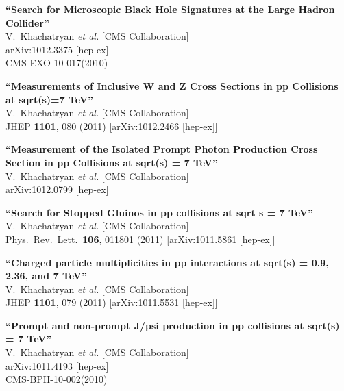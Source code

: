 \documentclass[10pt, a4paper]{article}
\begin{document}
\begin{thebibliography}{599}
{\bf ``Search for Microscopic Black Hole Signatures at the Large Hadron Collider''}
  \\{}V.~Khachatryan {\it et al.}  [CMS Collaboration]
  \\{}arXiv:1012.3375 [hep-ex]
\\{}CMS-EXO-10-017(2010)

{\bf ``Measurements of Inclusive W and Z Cross Sections in pp Collisions at sqrt(s)=7 TeV''}
  \\{}V.~Khachatryan {\it et al.}  [CMS Collaboration]
  \\{}JHEP {\bf 1101}, 080 (2011)
  [arXiv:1012.2466 [hep-ex]]

{\bf ``Measurement of the Isolated Prompt Photon Production Cross Section in pp Collisions at sqrt(s) = 7 TeV''}
  \\{}V.~Khachatryan {\it et al.}  [CMS Collaboration]
  \\{}arXiv:1012.0799 [hep-ex]

{\bf ``Search for Stopped Gluinos in pp collisions at sqrt s = 7 TeV''}
  \\{}V.~Khachatryan {\it et al.}  [CMS Collaboration]
  \\{}Phys.\ Rev.\ Lett.\  {\bf 106}, 011801 (2011)
  [arXiv:1011.5861 [hep-ex]]

{\bf ``Charged particle multiplicities in pp interactions at sqrt(s) = 0.9, 2.36, and 7 TeV''}
  \\{}V.~Khachatryan {\it et al.}  [CMS Collaboration]
  \\{}JHEP {\bf 1101}, 079 (2011)
  [arXiv:1011.5531 [hep-ex]]

{\bf ``Prompt and non-prompt J/psi production in pp collisions at sqrt(s) = 7 TeV''}
  \\{}V.~Khachatryan {\it et al.}  [CMS Collaboration]
  \\{}arXiv:1011.4193 [hep-ex]
\\{}CMS-BPH-10-002(2010)


\end{thebibliography}
\end{document}
